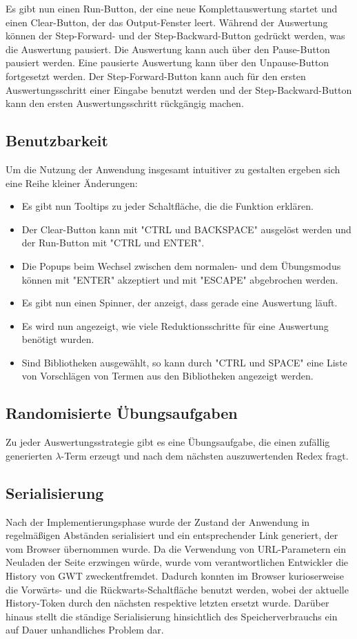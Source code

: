 \documentclass[parskip=full,11pt,openany]{scrreprt}
\begin{document}
Es gibt nun einen Run-Button, der eine neue Komplettauswertung startet und einen Clear-Button, der das Output-Fenster leert.
Während der Auswertung können der Step-Forward- und der Step-Backward-Button gedrückt werden, was die Auswertung pausiert. 
Die Auswertung kann auch über den Pause-Button pausiert werden.
Eine pausierte Auswertung kann über den Unpause-Button fortgesetzt werden.
Der Step-Forward-Button kann auch für den ersten Auswertungsschritt einer Eingabe benutzt werden und der Step-Back\-ward-Button
kann den ersten Auswertungsschritt rückgängig machen.

\subsection{Benutzbarkeit}
Um die Nutzung der Anwendung insgesamt intuitiver zu gestalten ergeben sich eine Reihe kleiner Änderungen:

\begin{itemize}
\item Es gibt nun Tooltips zu jeder Schaltfläche, die die Funktion erklären.
\item Der Clear-Button kann mit "CTRL und BACKSPACE" ausgelöst werden und der Run-Button mit "CTRL und ENTER".
\item Die Popups beim Wechsel zwischen dem normalen- und dem Übungsmodus können mit "ENTER" akzeptiert und mit
"ESCAPE" abgebrochen werden.
\item Es gibt nun einen Spinner, der anzeigt, dass gerade eine Auswertung läuft.
\item Es wird nun angezeigt, wie viele Reduktionsschritte für eine Auswertung benötigt wurden.
\item Sind Bibliotheken ausgewählt, so kann durch "CTRL und SPACE" eine Liste von Vorschlägen von Termen aus den 
Bibliotheken angezeigt werden.
\end{itemize}

\subsection{Randomisierte Übungsaufgaben}
Zu jeder Auswertungsstrategie gibt es eine Übungsaufgabe, die einen zufällig generierten $\lambda$-Term erzeugt
und nach dem nächsten auszuwertenden Redex fragt.

\subsection{Serialisierung}
Nach der Implementierungsphase wurde der Zustand der Anwendung in regelmäßigen Abständen serialisiert und 
ein entsprechender Link generiert, der vom Browser übernommen wurde.
Da die Verwendung von URL-Parametern ein Neuladen der Seite erzwingen würde, wurde vom verantwortlichen 
Entwickler die History von GWT zweckentfremdet.
Dadurch konnten im Browser kurioserweise die Vorwärts- und die Rückwarts-Schaltfläche benutzt werden, wobei
der aktuelle History-Token durch den nächsten respektive letzten ersetzt wurde.
Darüber hinaus stellt die ständige Serialisierung hinsichtlich des Speicherverbrauchs ein auf Dauer unhandliches
Problem dar.
\end{document}
